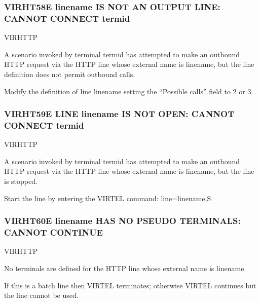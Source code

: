 \documentclass[letterpaper,10pt,english]{sphinxmanual}
\begin{document}
\subsubsection{VIRHT58E linename IS NOT AN OUTPUT LINE: CANNOT CONNECT termid}
\label{\detokenize{messages:virht58e-linename-is-not-an-output-line-cannot-connect-termid}}\begin{description}
\sphinxAtStartPar
VIRHTTP

\sphinxAtStartPar
A scenario invoked by terminal termid has attempted to make an outbound HTTP request via the HTTP line whose external name is linename, but the line definition does not permit outbound calls.

\sphinxAtStartPar
Modify the definition of line linename setting the “Possible calls” field to 2 or 3.

\end{description}


\subsubsection{VIRHT59E LINE linename IS NOT OPEN: CANNOT CONNECT termid}
\label{\detokenize{messages:virht59e-line-linename-is-not-open-cannot-connect-termid}}\begin{description}
\sphinxAtStartPar
VIRHTTP

\sphinxAtStartPar
A scenario invoked by terminal termid has attempted to make an outbound HTTP request via the HTTP line whose external name is linename, but the line is stopped.

\sphinxAtStartPar
Start the line by entering the VIRTEL command: line=linename,S

\end{description}


\subsubsection{VIRHT60E linename HAS NO PSEUDO TERMINALS: CANNOT CONTINUE}
\label{\detokenize{messages:virht60e-linename-has-no-pseudo-terminals-cannot-continue}}\begin{description}
\sphinxAtStartPar
VIRHTTP

\sphinxAtStartPar
No terminals are defined for the HTTP line whose external name is linename.

\sphinxAtStartPar
If this is a batch line then VIRTEL terminates; otherwise VIRTEL continues but the line cannot be used.

\end{description}
\end{document}
